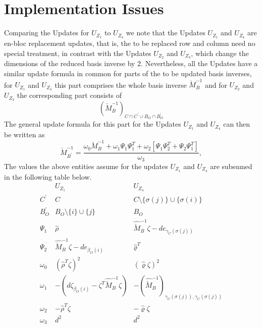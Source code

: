 \documentclass[a4paper]{article}
\begin{document}
\section{Implementation Issues}
Comparing the Updates for $U_{Z_{1}}$ to $U_{Z_{4}}$ we note that the Updates
$U_{Z_{1}}$ and $U_{Z_{4}}$ are en-bloc replacement updates, that is, the to be
replaced row and column need no special treatment, in contrast with the Updates
$U_{Z_{2}}$ and $U_{Z_{3}}$, which change the dimensions of the reduced basis
inverse by $2$. Nevertheless, all the Updates have a similar update
formula in common for parts of the to be updated basis inverses,
for $U_{Z_{1}}$ and $U_{Z_{4}}$ this part comprises the whole
basis inverse $\check{M}_{B}^{-1}$ and for $U_{Z_{2}}$
and $U_{Z_{3}}$ the corresponding part consists of  
\begin{equation}
\left(
 \check{M}_{B}^{-1}
\right)_{C \cap C^{\prime} \cup B_{O} \cap B_{O}^{\prime}}
\end{equation}
The general update formula for this part for the Updates
$U_{Z_{1}}$ and $U_{Z_{4}}$ can then be written as 
\begin{equation}
\check{M}_{B^{\prime}}^{-1}
=
\frac{
\omega_{0}\check{M}_{B}^{-1}
+\omega_{1}\Psi_{1}\Psi_{1}^{T}
+\omega_{2}\left[\Psi_{1}\Psi_{2}^{T}+\Psi_{2}\Psi_{1}^{T}\right]
}{\omega_{3}},
\end{equation}
The values the above entities assume for the updates $U_{Z_{1}}$ and
$U_{Z_{4}}$ are subsumed in the following table below.
\begin{equation}
\begin{array}{c|cc}
& U_{Z_{1}} & U_{Z_{4}} \\
\hline
C^{\prime}
& C
& C \setminus \{\sigma(j)\} \cup \{\sigma(i)\}
\\
B_{O}^{\prime}
& B_{O} \setminus \{i\} \cup \{j\}
& B_{O}
\\
\Psi_{1}
& \hat{\rho}
& \hat{\check{M}}_{B}^{-1}\zeta-de_{\gamma_{C}(\sigma(j))}
\\
\Psi_{2}
& \hat{\check{M}}_{B}^{-1}\zeta-de_{\beta_{O}(i)}
& \hat{\varrho}^{T}
\\
\omega_{0}
& \left(\hat{\rho}^{T}\zeta\right)^{2}
& \left(\hat{\varrho}\zeta\right)^{2}
\\
\omega_{1}
& -\left(
   d\zeta_{\beta_{O}(i)}-\zeta^{T}\hat{\check{M}}_{B}^{-1}\zeta
  \right) 
& -\left(
   \hat{\check{M}}_{B}^{-1}
  \right)_{\gamma_{C}(\sigma(j)), \gamma_{C}(\sigma(j))} 
\\
\omega_{2}
& -\hat{\rho}^{T}\zeta
& -\hat{\varrho}\zeta
\\
\omega_{3}
& d^{2}
& d^{2}
\end{array}
\end{equation}
 
\end{document}
